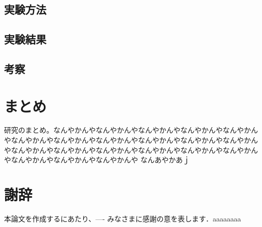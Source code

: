 \documentclass[11pt,a4j]{jreport}
\begin{document}
\section{実験方法}
\section{実験結果}
\section{考察}

\chapter{まとめ}
研究のまとめ。なんやかんやなんやかんやなんやかんやなんやかんやなんやかんやなんやかんやなんやかんやなんやかんやなんやかんやなんやかんやなんやかんやなんやかんやなんやかんやなんやかんやなんやかんやなんやかんやなんやかんやなんやかんやなんやかんやなんやかんや
なんあやかあｊ
\chapter*{謝辞} %
本論文を作成するにあたり、---- みなさまに感謝の意を表します．aaaaaaaa


\renewcommand{\bibname}{参考文献} %
\end{document}
